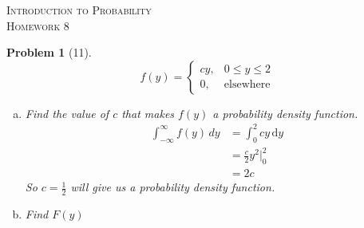 \documentclass{article}
\theoremstyle{problem}
\newtheorem{prob}{Problem}
\theoremstyle{remark}
\begin{document}
\begin{center}
  \textsc{\Large Introduction to Probability}\\[.3cm]
  \textsc{\Large Homework 8}
\end{center}

\begin{prob}[11]
  $$
  f(y) =
  \begin{cases}
    cy, & 0 \leq y \leq 2\\
    0, & \text{elsewhere}
  \end{cases}
  $$
  \begin{enumerate}[a)]
  \item Find the value of $c$ that makes $f(y)$ a probability density function.
    \begin{align*}
      \int_{-\infty}^\infty f(y)\, dy &= \int_0^2 cy\, \mathrm{d}y\\
      &= \frac{c}{2}y^2 \Big|_0^2\\
      &= 2c
    \end{align*}
    So $c = \frac{1}{2}$ will give us a probability density function.
  \item Find $F(y)$
  \end{enumerate}
\end{prob}
\end{document}
